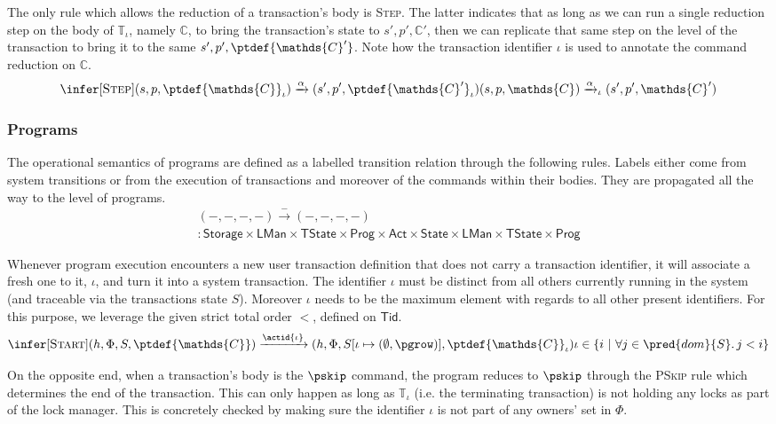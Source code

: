 The only rule which allows the reduction of a transaction's body is \textsc{Step}. The latter indicates that as long as we can run a single reduction step on the body of $\mathds{T}_\iota$, namely $\mathds{C}$, to bring the transaction's state to $s', p', \mathds{C}'$, then we can replicate that same step on the level of the transaction to bring it to the same $s', p', \ptdef{\mathds{C}'}$. Note how the transaction identifier $\iota$ is used to annotate the command reduction on $\mathds{C}$.
\[
\infer[\textsc{Step}]
{
	(s, p, \ptdef{\mathds{C}}_\iota)
	\xrightarrow{\alpha}
	(s', p', \ptdef{\mathds{C}'}_\iota)
}
{
	(s, p, \mathds{C})
	\xrightarrow{\alpha}_\iota
	(s', p', \mathds{C}')
}
\]

\subsubsection{Programs}

The operational semantics of programs are defined as a labelled transition relation through the following rules. Labels either come from system transitions or from the execution of transactions and moreover of the commands within their bodies. They are propagated all the way to the level of programs.
\begin{gather*}
(-, -, -, -) \xrightarrow{-} (-, -, -, -) \\
: \mathsf{Storage} \times \mathsf{LMan} \times \mathsf{TState} \times \mathsf{Prog} \times \mathsf{Act} \times \mathsf{State} \times \mathsf{LMan} \times \mathsf{TState} \times \mathsf{Prog}
\end{gather*}

Whenever program execution encounters a new user transaction definition that does not carry a transaction identifier, it will associate a fresh one to it, $\iota$, and turn it into a system transaction. The identifier $\iota$ must be distinct from all others currently running in the system (and traceable via the transactions state $S$). Moreover $\iota$ needs to be the maximum element with regards to all other present identifiers. For this purpose, we leverage the given strict total order $<$, defined on $\mathsf{Tid}$.
\[
\infer[\textsc{Start}]
{
	(h, \Phi, S, \ptdef{\mathds{C}})
	\xrightarrow{\actid{\iota}}
	(h, \Phi, S[\iota \mapsto (\emptyset, \pgrow)], \ptdef{\mathds{C}}_\iota)
}
{
	\iota \in \{ i\ |\ \forall j \in \pred{dom}{S} \ldotp j < i \}
}
\]

On the opposite end, when a transaction's body is the $\pskip$ command, the program reduces to $\pskip$ through the \textsc{PSkip} rule which determines the end of the transaction. This can only happen as long as $\mathds{T}_\iota$ (i.e. the terminating transaction) is not holding any locks as part of the lock manager. This is concretely checked by making sure the identifier $\iota$ is not part of any owners' set in $\Phi$.

